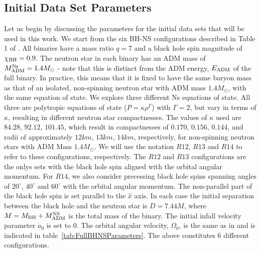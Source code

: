 \subsection{Initial Data Set Parameters}
Let us begin by discussing the parameters for the initial data sets
that will be used in this work. We start from the six BH-NS
configurations described in Table 1 of \cite{Foucart:2013a}. All
binaries have a mass ratio $q=7$ and a black hole spin magnitude of
$\chi_{\rm BH}=0.9$. The neutron star in each binary has
an ADM mass of $M^{\rm Ns}_{\rm ADM}=1.4M_{\odot}$ - note that this is
distinct from the ADM energy, $E_{\rm ADM}$ of the full binary. In
practice, this means that it is fixed to have the same baryon mass as
that of an isolated, non-spinning neutron star with ADM mass
$1.4M_{\odot}$, with the same equation of state. We explore three
different Ns equations of state. All three are polytropic equations of
state ($P=\kappa\rho^\Gamma$) with $\Gamma=2$, but vary in terms of
$\kappa$, resulting in different neutron star compactnesses. The
values of $\kappa$ used are $84.28$, $92.12$, $101.45$, which result
in compactnesses of $0.170$, $0.156$, $0.144$, and radii of
approximately $12km$, $13km$, $14km$, respectively, for non-spinning
neutron stars with ADM Mass $1.4M_{\odot}$. We will use the notation
$R12$, $R13$ and $R14$ to refer to these configurations,
respectively. The $R12$ and $R13$ configurations are the onlys sets
with the black hole spin aligned with the orbital angular
momentum. For $R14$, we also consider precessing
black hole spins spanning angles of $20^{\circ}$, $40^{\circ}$ and
$60^{\circ}$ with the orbital angular momentum. The non-parallel part of the black hole spin is set
parallel to the $\hat{x}$ axis. In each case the initial separation
between the black hole and the neutron star is $D=7.44M$, where
$M=M_{\rm BH}+M_{\rm ADM}^{\rm NS}$ is the total mass of the
binary. The initial infall velocity parameter $\dot{a}_0$ is set to
$0$. The orbital angular velocity, $\Omega_0$, is the same as in \cite{Foucart:2013a} and is indicated in table~\ref{tab:FullBHNSParameters}.
The above constitutes 6 different configurations. 

